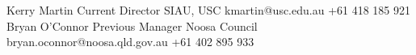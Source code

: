 %
%
%


\begin{referees}
		{Kerry Martin}
		{Current Director}
		{SIAU, USC}
		{kmartin@usc.edu.au}
		{+61 418 185 921}
		{Bryan O'Connor}
		{Previous Manager}
		{Noosa Council}
		{bryan.oconnor@noosa.qld.gov.au}
		{+61 402 895 933}
\end{referees}